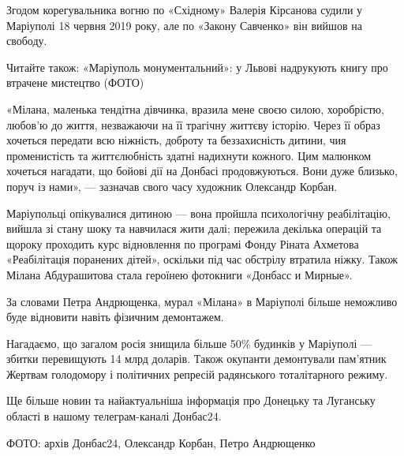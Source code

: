 Згодом корегувальника вогню по «Східному» Валерія Кірсанова судили у Маріуполі
18 червня 2019 року, але по «Закону Савченко» він вийшов на свободу.

Читайте також: «Маріуполь монументальний»: у Львові надрукують книгу про
втрачене мистецтво (ФОТО)

«Мілана, маленька тендітна дівчинка, вразила мене своєю силою, хоробрістю,
любов’ю до життя, незважаючи на її трагічну життєву історію. Через її образ
хочеться передати всю ніжність, доброту та беззахисність дитини, чия
променистість та життєлюбність здатні надихнути кожного. Цим малюнком хочеться
нагадати, що бойові дії на Донбасі продовжуються. Вони дуже близько, поруч із
нами», — зазначав свого часу художник Олександр Корбан.

Маріупольці опікувалися дитиною — вона пройшла психологічну реабілітацію,
вийшла зі стану шоку та навчилася жити далі; пережила декілька операцій та
щороку проходить курс відновлення по програмі Фонду Ріната Ахметова
«Реабілітація поранених дітей», оскільки під час обстрілу втратила ніжку. Також
Мілана Абдурашитова стала героїнею фотокниги «Донбасс и Мирные».

За словами Петра Андрющенка, мурал «Мілана» в Маріуполі більше неможливо буде
відновити навіть фізичним демонтажем.

Нагадаємо, що загалом росія знищила більше 50\% будинків у Маріуполі — збитки
перевищують 14 млрд доларів. Також окупанти демонтували пам’ятник Жертвам
голодомору і політичних репресій радянського тоталітарного режиму.

Ще більше новин та найактуальніша інформація про Донецьку та Луганську області
в нашому телеграм-каналі Донбас24.

ФОТО: архів Донбас24, Олександр Корбан, Петро Андрющенко
